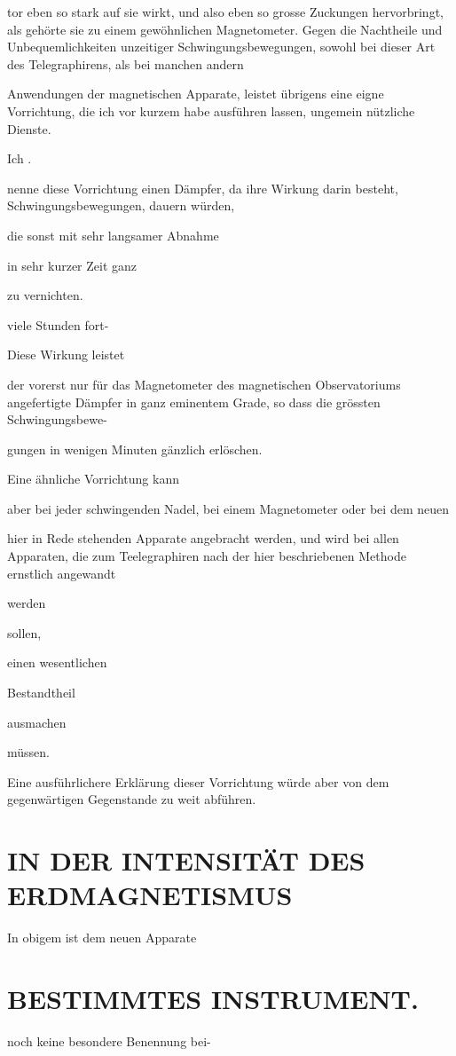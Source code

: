 \documentclass[12pt,a4paper]{article}
\begin{document}
tor eben so stark auf sie wirkt, und also eben so grosse Zuckungen hervorbringt, als gehörte sie zu einem gewöhnlichen Magnetometer. Gegen die Nachtheile und Unbequemlichkeiten unzeitiger Schwingungsbewegungen, sowohl bei dieser Art des Telegraphirens, als bei manchen andern

Anwendungen der magnetischen Apparate, leistet übrigens eine eigne Vorrichtung, die ich vor kurzem habe ausführen lassen, ungemein nützliche Dienste.

Ich .

nenne diese Vorrichtung einen Dämpfer, da ihre Wirkung darin besteht, Schwingungsbewegungen, dauern würden,

die sonst mit sehr langsamer Abnahme

in sehr kurzer Zeit ganz

zu vernichten.

viele Stunden fort-

Diese Wirkung leistet

der vorerst nur für das Magnetometer des magnetischen Observatoriums angefertigte Dämpfer in ganz eminentem Grade, so dass die grössten Schwingungsbewe-

gungen in wenigen Minuten gänzlich erlöschen.

Eine ähnliche Vorrichtung kann

aber bei jeder schwingenden Nadel, bei einem Magnetometer oder bei dem neuen

hier in Rede stehenden Apparate angebracht werden, und wird bei allen Apparaten, die zum Teelegraphiren nach der hier beschriebenen Methode ernstlich angewandt

werden

sollen,

einen wesentlichen

Bestandtheil

ausmachen

müssen.

Eine ausführlichere Erklärung dieser Vorrichtung würde aber von dem gegenwärtigen Gegenstande zu weit abführen.

\section*{IN DER INTENSITÄT DES ERDMAGNETISMUS}
In obigem ist dem neuen Apparate

\section*{BESTIMMTES INSTRUMENT.}
noch keine besondere Benennung bei-
\end{document}
